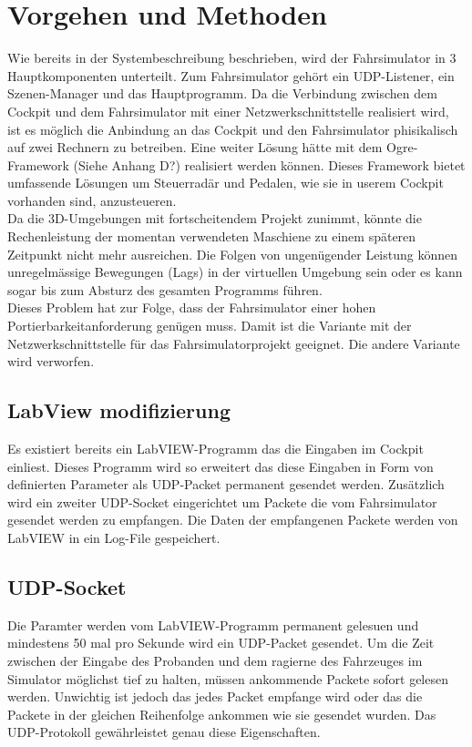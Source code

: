 \section{Vorgehen und Methoden}
Wie bereits in der Systembeschreibung beschrieben, wird der Fahrsimulator in 3 Hauptkomponenten unterteilt. Zum Fahrsimulator gehört ein UDP-Listener, ein Szenen-Manager und das Hauptprogramm. Da die Verbindung zwischen dem Cockpit und dem Fahrsimulator mit einer Netzwerkschnittstelle realisiert wird, ist es möglich die Anbindung an das Cockpit und den Fahrsimulator phisikalisch auf zwei Rechnern zu betreiben. Eine weiter Lösung hätte mit dem Ogre-Framework (Siehe Anhang D?) realisiert werden können. Dieses Framework bietet umfassende Lösungen um Steuerradär und Pedalen, wie sie in userem Cockpit vorhanden sind, anzusteueren.\\
Da die 3D-Umgebungen mit fortscheitendem Projekt zunimmt, könnte die Rechenleistung der momentan verwendeten Maschiene zu einem späteren Zeitpunkt nicht mehr ausreichen. Die Folgen von ungenügender Leistung können unregelmässige Bewegungen (Lags) in der virtuellen Umgebung sein oder es kann sogar bis zum Absturz des gesamten Programms führen. \\
Dieses Problem hat zur Folge, dass der Fahrsimulator einer hohen Portierbarkeitanforderung genügen muss. Damit ist die Variante mit der Netzwerkschnittstelle für das Fahrsimulatorprojekt geeignet. Die andere Variante wird verworfen.
\subsection{LabView modifizierung}
Es existiert bereits ein LabVIEW-Programm das die Eingaben im Cockpit einliest. Dieses Programm wird so erweitert das diese Eingaben in Form von definierten Parameter als UDP-Packet permanent gesendet werden. Zusätzlich wird ein zweiter UDP-Socket eingerichtet um Packete die vom Fahrsimulator gesendet werden zu empfangen. Die Daten der empfangenen Packete werden von LabVIEW in ein Log-File gespeichert. 
\subsection{UDP-Socket}
Die Paramter werden vom LabVIEW-Programm permanent gelesuen und mindestens 50 mal pro Sekunde wird ein UDP-Packet gesendet. Um die Zeit zwischen der Eingabe des Probanden und dem ragierne des Fahrzeuges im Simulator möglichst tief zu halten, müssen ankommende Packete sofort gelesen werden. Unwichtig ist jedoch das jedes Packet empfange wird oder das die Packete in der gleichen Reihenfolge ankommen wie sie gesendet wurden. Das UDP-Protokoll gewährleistet genau diese Eigenschaften. \\

